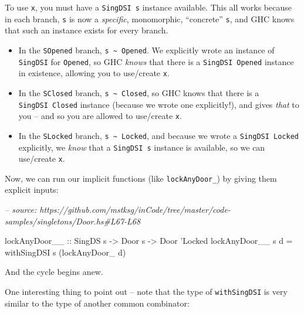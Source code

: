 \documentclass[]{article}
\newenvironment{Shaded}{}{}
\newcommand{\CommentTok}[1]{\textcolor[rgb]{0.38,0.63,0.69}{\textit{#1}}}
\newcommand{\DataTypeTok}[1]{\textcolor[rgb]{0.56,0.13,0.00}{#1}}
\newcommand{\FunctionTok}[1]{\textcolor[rgb]{0.02,0.16,0.49}{#1}}
\newcommand{\NormalTok}[1]{#1}
\newcommand{\OtherTok}[1]{\textcolor[rgb]{0.00,0.44,0.13}{#1}}
\begin{document}
To use \texttt{x}, you must have a \texttt{SingDSI\ s} instance available. This
all works because in each branch, \texttt{s} is now a \emph{specific},
monomorphic, ``concrete'' \texttt{s}, and GHC knows that such an instance exists
for every branch.

\begin{itemize}
\tightlist
\item
  In the \texttt{SOpened} branch,
  \texttt{s\ \textasciitilde{}\ \textquotesingle{}Opened}. We explicitly wrote
  an instance of \texttt{SingDSI} for \texttt{\textquotesingle{}Opened}, so GHC
  \emph{knows} that there is a \texttt{SingDSI\ \textquotesingle{}Opened}
  instance in existence, allowing you to use/create \texttt{x}.
\item
  In the \texttt{SClosed} branch,
  \texttt{s\ \textasciitilde{}\ \textquotesingle{}Closed}, so GHC knows that
  there is a \texttt{SingDSI\ \textquotesingle{}Closed} instance (because we
  wrote one explicitly!), and gives \emph{that} to you -- and so you are allowed
  to use/create \texttt{x}.
\item
  In the \texttt{SLocked} branch,
  \texttt{s\ \textasciitilde{}\ \textquotesingle{}Locked}, and because we wrote
  a \texttt{SingDSI\ \textquotesingle{}Locked} explicitly, we \emph{know} that a
  \texttt{SingDSI\ s} instance is available, so we can use/create \texttt{x}.
\end{itemize}

Now, we can run our implicit functions (like \texttt{lockAnyDoor\_}) by giving
them explicit inputs:

\begin{Shaded}
\begin{Highlighting}[]
\CommentTok{-- source: https://github.com/mstksg/inCode/tree/master/code-samples/singletons/Door.hs#L67-L68}

\OtherTok{lockAnyDoor__ ::} \DataTypeTok{SingDS}\NormalTok{ s }\OtherTok{->} \DataTypeTok{Door}\NormalTok{ s }\OtherTok{->} \DataTypeTok{Door}\NormalTok{ '}\DataTypeTok{Locked}
\NormalTok{lockAnyDoor__ s d }\FunctionTok{=}\NormalTok{ withSingDSI s (lockAnyDoor_ d)}
\end{Highlighting}
\end{Shaded}

And the cycle begins anew.

One interesting thing to point out -- note that the type of \texttt{withSingDSI}
is very similar to the type of another common combinator:

\begin{Shaded}
\end{Shaded}
\end{document}
